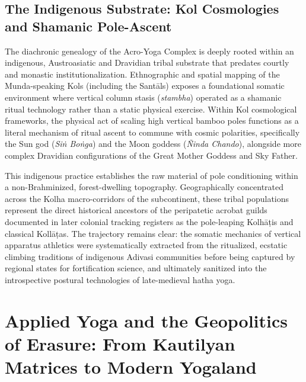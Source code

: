 \documentclass[11pt,twoside,letterpaper]{article}
\begin{document}
\subsection{The Indigenous Substrate: Kol Cosmologies and Shamanic Pole-Ascent}

The diachronic genealogy of the Acro-Yoga Complex is deeply rooted within an indigenous, Austroasiatic and Dravidian tribal substrate that predates courtly and monastic institutionalization. Ethnographic and spatial mapping of the Munda-speaking Kols (including the Santāls) exposes a foundational somatic environment where vertical column stasis (\textit{stambha}) operated as a shamanic ritual technology rather than a static physical exercise. Within Kol cosmological frameworks, the physical act of scaling high vertical bamboo poles functions as a literal mechanism of ritual ascent to commune with cosmic polarities, specifically the Sun god (\textit{Siṅ Boṅga}) and the Moon goddess (\textit{Ñinda Chando}), alongside more complex Dravidian configurations of the Great Mother Goddess and Sky Father. 

This indigenous practice establishes the  raw material of pole conditioning within a non-Brahminized, forest-dwelling topography. Geographically concentrated across the Kolha macro-corridors of the subcontinent, these tribal populations represent the direct historical ancestors of the peripatetic acrobat guilds documented in later colonial tracking registers as the pole-leaping Kolhāṭis and classical Kollāṭas. The trajectory remains clear: the somatic mechanics of vertical apparatus athletics were systematically extracted from the ritualized, ecstatic climbing traditions of indigenous Adivasi communities before being captured by regional states for fortification science, and ultimately sanitized into the introspective postural technologies of late-medieval hatha yoga.

\section{Applied Yoga and the Geopolitics of Erasure: From Kautilyan Matrices to Modern Yogaland}
\end{document}
